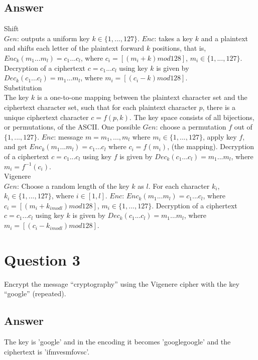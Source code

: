 \documentclass{article}
\begin{document}
\subsection{Answer}
Shift \\
$Gen$: outputs a uniform key $k \in \{1,... , 127\}$. $Enc$: takes a key $k$ and a plaintext and shifts each letter of the plaintext forward $k$ positions, that is, $Enc_k(m_1...m_l) = c_1...c_l$, where $c_i = [(m_i + k) mod 128]$, $m_i \in \{1,... , 127\}$. Decryption of a ciphertext $c = c_1...c_l$ using key $k$ is given by $Dec_k( c_1...c_l) = m_1...m_l$, where $m_i = [(c_i - k) mod 128]$.
\\
Substitution \\
The key $k$ is a one-to-one mapping between the plaintext character set and the ciphertext character set, such that for each plaintext character $p$, there is a unique ciphertext character $c = f(p, k)$. The key space consists of all bijections, or permutations, of the ASCII. One possible $Gen$: choose a permutation $f$ out of $\{1, ..., 127\}$. $Enc$:  message $m = m_1, ..., m_l$ where $m_i \in \{1,... , 127\}$, apply key $f$, and get $Enc_k(m_1...m_l) = c_1...c_l$ where $c_i = f(m_i)$, (the mapping). Decryption of a ciphertext $c = c_1...c_l$ using key $f$ is given by $Dec_k( c_1...c_l) = m_1...m_l$, where $m_i = f^{-1}(c_i)$.
\\
Vigenere\\
$Gen$: Choose a random length of the key $k$ as $l$. For each character $k_i$, $k_i \in \{1,... , 127\}$, where $i \in [1, l]$. $Enc$: $Enc_k(m_1...m_l) = c_1...c_l$, where $c_i = [(m_i + k_{i mod l}) mod 128]$, $m_i \in \{1,... , 127\}$. Decryption of a ciphertext $c = c_1...c_l$ using key $k$ is given by $Dec_k( c_1...c_l) = m_1...m_l$, where $m_i = [(c_i - k_{i mod l}) mod 128]$.


\section{Question 3}
Encrypt the message “cryptography” using the Vigenere cipher with the key “google” (repeated).


\subsection{Answer}
The key is 'google' and in the encoding it becomes 'googlegoogle' and the ciphertext is 'ifmvesmfovsc'.
\end{document}
